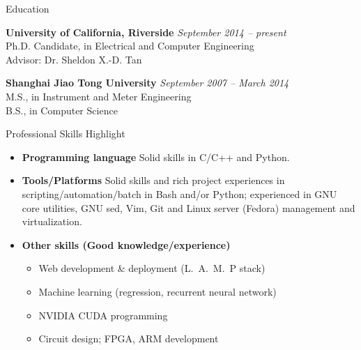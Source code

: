 \documentclass{resume} %
\begin{document}

\begin{rSection}{Education}

{\bf University of California, Riverside} \hfill {\em September 2014 -- present} \\
Ph.D. Candidate, in Electrical and Computer Engineering \\
Advisor: Dr. Sheldon X.-D. Tan

{\bf Shanghai Jiao Tong University} \hfill {\em September 2007 -- March 2014} \\
M.S., in Instrument and Meter Engineering\\
B.S., in Computer Science

\end{rSection}

\begin{rSection}{Professional Skills Highlight}

    \begin{itemize}

        \item \textbf{Programming language} Solid skills in C/C++ and Python.

        \item \textbf{Tools/Platforms} Solid skills and rich project experiences in
            scripting/automation/batch in Bash and/or Python; experienced in
            GNU core utilities, GNU sed, Vim, Git and Linux server (Fedora)
            management and virtualization.

        \item \textbf{Other skills (Good knowledge/experience)}

            \begin{itemize}
                \item Web development \& deployment (L.~A.~M.~P stack)
                \item Machine learning (regression, recurrent neural network)
                \item NVIDIA CUDA programming
                \item Circuit design; FPGA, ARM development
            \end{itemize}

    \end{itemize}

\end{rSection}
\end{document}
